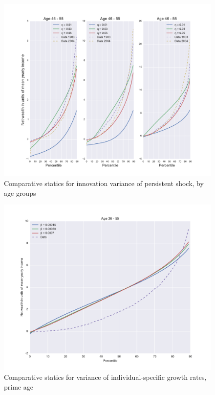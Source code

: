 \begin{figure}
\includegraphics[width=\columnwidth]{comp_stat_eta_agedetail}
\caption{Comparative statics for innovation variance of persistent shock, by age groups}
\label{fig:comp_stat_eta_agedetail}
\end{figure}

\begin{figure}
\includegraphics[width=\columnwidth]{comp_stat_beta}
\caption{Comparative statics for variance of individual-specific growth rates, prime age}
\label{fig:comp_stat_beta}
\end{figure}

